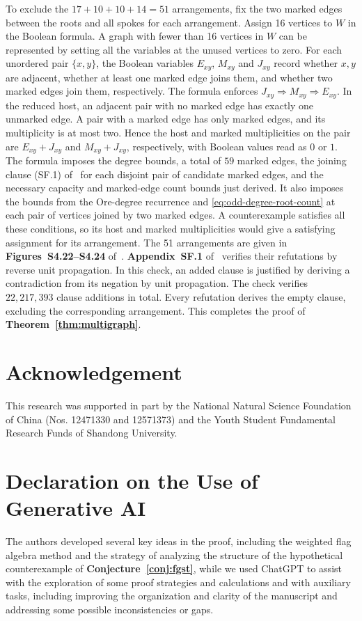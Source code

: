 \documentclass[preprint,11pt,numbers]{elsarticle-arxiv}
\numberwithin{equation}{section}
\theoremstyle{definition}
\begin{document}
To exclude the $17+10+10+14=51$ arrangements, fix the two
marked edges between the roots and all spokes for each
arrangement. Assign 16 vertices to $W$ in the Boolean formula.
A graph with fewer than 16 vertices in $W$ can be represented
by setting all the variables at the unused vertices to zero.
For each unordered pair
$\{x,y\}$, the Boolean variables $E_{xy}$, $M_{xy}$ and $J_{xy}$
record whether $x,y$ are adjacent, whether at least one marked
edge joins them, and whether two marked edges join them,
respectively. The formula enforces
$J_{xy}\Rightarrow M_{xy}\Rightarrow E_{xy}$. In the reduced
host, an adjacent pair with no marked edge has exactly one
unmarked edge. A pair with a marked edge has only marked edges,
and its multiplicity is at most two. Hence the host and marked
multiplicities on the pair are $E_{xy}+J_{xy}$ and
$M_{xy}+J_{xy}$, respectively, with Boolean values read as $0$ or $1$.
The formula imposes the degree bounds, a total of $59$ marked
edges, the joining clause
(SF.1) of~\cite{FGSTSupplement} for
each disjoint pair of candidate marked edges, and the
necessary capacity and marked-edge count bounds just derived.
It also imposes the bounds from the Ore-degree recurrence and
\eqref{eq:odd-degree-root-count} at each pair of vertices
joined by two marked edges. A counterexample satisfies all
these conditions, so its host and marked multiplicities would
give a satisfying assignment for its arrangement. The 51
arrangements are given in
\textbf{Figures~S4.22--S4.24} of~\cite{FGSTSupplement}.
\textbf{Appendix~SF.1} of~\cite{FGSTSupplement} verifies their
refutations by reverse unit propagation. In this check,
an added clause is justified by deriving a contradiction from its
negation by unit propagation.
The check verifies $22{,}217{,}393$ clause additions in total.
Every refutation derives the empty clause, excluding
the corresponding arrangement. This completes the proof of
\textbf{Theorem~\ref{thm:multigraph}}.

\section*{Acknowledgement}
This research was supported in part by the National Natural Science Foundation
of China (Nos. 12471330 and 12571373) and the Youth Student Fundamental Research
Funds of Shandong University.

\section*{Declaration on the Use of Generative AI}
The authors developed several key ideas in the proof, including
the weighted flag algebra method and the strategy of analyzing
the structure of the hypothetical counterexample of
\textbf{Conjecture~\ref{conj:fgst}}, while we used ChatGPT to assist
with the exploration of some proof strategies and calculations
and with auxiliary tasks, including improving the organization
and clarity of the manuscript and addressing some possible
inconsistencies or gaps.
\relax\space%

\begingroup
\small
\setlength{\bibsep}{3pt plus .3pt minus .3pt}
{}

\endgroup
\end{document}
